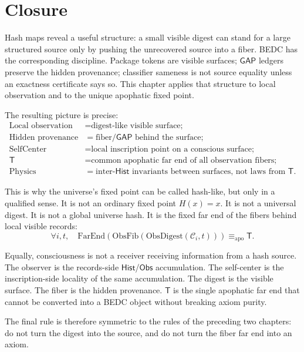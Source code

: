 \section{Closure}
\label{sec:hash-like-closure}

Hash maps reveal a useful structure: a small visible digest can stand for a large structured source only by pushing the unrecovered source into a fiber. BEDC has the corresponding discipline. Package tokens are visible surfaces; $\mathsf{GAP}$ ledgers preserve the hidden provenance; classifier sameness is not source equality unless an exactness certificate says so. This chapter applies that structure to local observation and to the unique apophatic fixed point.

The resulting picture is precise:
$$
\begin{aligned}
\text{Local observation} &= \text{digest-like visible surface;} \\
\text{Hidden provenance} &= \text{fiber}/\mathsf{GAP}\text{ behind the surface;} \\
\mathrm{SelfCenter} &= \text{local inscription point on a conscious surface;} \\
\mathsf{T} &= \text{common apophatic far end of all observation fibers;} \\
\text{Physics} &= \text{inter-}\mathsf{Hist}\text{ invariants between surfaces, not laws from }\mathsf{T}.
\end{aligned}
$$

This is why the universe's fixed point can be called hash-like, but only in a qualified sense. It is not an ordinary fixed point $H(x) = x$. It is not a universal digest. It is not a global universe hash. It is the fixed far end of the fibers behind local visible records:
$$
\forall i, t,\quad \mathrm{FarEnd}(\mathrm{ObsFib}(\mathrm{ObsDigest}(\mathcal{C}_i, t))) \equiv_{\mathrm{apo}} \mathsf{T}.
$$

Equally, consciousness is not a receiver receiving information from a hash source. The observer is the records-side $\mathsf{Hist}$/$\mathsf{Obs}$ accumulation. The self-center is the inscription-side locality of the same accumulation. The digest is the visible surface. The fiber is the hidden provenance. $\mathsf{T}$ is the single apophatic far end that cannot be converted into a BEDC object without breaking axiom purity.

The final rule is therefore symmetric to the rules of the preceding two chapters: do not turn the digest into the source, and do not turn the fiber far end into an axiom.

